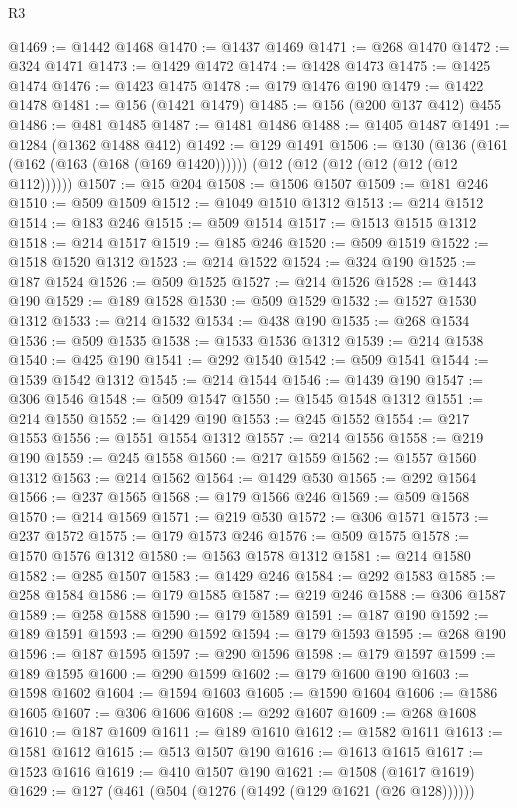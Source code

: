 \begin{lexlean}{R3}
\begin{coremodule}
@1469 := @1442 @1468
@1470 := @1437 @1469
@1471 := @268 @1470
@1472 := @324 @1471
@1473 := @1429 @1472
@1474 := @1428 @1473
@1475 := @1425 @1474
@1476 := @1423 @1475
@1478 := @179 @1476 @190
@1479 := @1422 @1478
@1481 := @156 (@1421 @1479)
@1485 := @156 (@200 @137 @412) @455
@1486 := @481 @1485
@1487 := @1481 @1486
@1488 := @1405 @1487
@1491 := @1284 (@1362 @1488 @412)
@1492 := @129 @1491
@1506 := @130
    (@136 (@161 (@162 (@163 (@168 (@169 @1420))))))
    (@12 (@12 (@12 (@12 (@12 (@12 @112))))))
@1507 := @15 @204
@1508 := @1506 @1507
@1509 := @181 @246
@1510 := @509 @1509
@1512 := @1049 @1510 @1312
@1513 := @214 @1512
@1514 := @183 @246
@1515 := @509 @1514
@1517 := @1513 @1515 @1312
@1518 := @214 @1517
@1519 := @185 @246
@1520 := @509 @1519
@1522 := @1518 @1520 @1312
@1523 := @214 @1522
@1524 := @324 @190
@1525 := @187 @1524
@1526 := @509 @1525
@1527 := @214 @1526
@1528 := @1443 @190
@1529 := @189 @1528
@1530 := @509 @1529
@1532 := @1527 @1530 @1312
@1533 := @214 @1532
@1534 := @438 @190
@1535 := @268 @1534
@1536 := @509 @1535
@1538 := @1533 @1536 @1312
@1539 := @214 @1538
@1540 := @425 @190
@1541 := @292 @1540
@1542 := @509 @1541
@1544 := @1539 @1542 @1312
@1545 := @214 @1544
@1546 := @1439 @190
@1547 := @306 @1546
@1548 := @509 @1547
@1550 := @1545 @1548 @1312
@1551 := @214 @1550
@1552 := @1429 @190
@1553 := @245 @1552
@1554 := @217 @1553
@1556 := @1551 @1554 @1312
@1557 := @214 @1556
@1558 := @219 @190
@1559 := @245 @1558
@1560 := @217 @1559
@1562 := @1557 @1560 @1312
@1563 := @214 @1562
@1564 := @1429 @530
@1565 := @292 @1564
@1566 := @237 @1565
@1568 := @179 @1566 @246
@1569 := @509 @1568
@1570 := @214 @1569
@1571 := @219 @530
@1572 := @306 @1571
@1573 := @237 @1572
@1575 := @179 @1573 @246
@1576 := @509 @1575
@1578 := @1570 @1576 @1312
@1580 := @1563 @1578 @1312
@1581 := @214 @1580
@1582 := @285 @1507
@1583 := @1429 @246
@1584 := @292 @1583
@1585 := @258 @1584
@1586 := @179 @1585
@1587 := @219 @246
@1588 := @306 @1587
@1589 := @258 @1588
@1590 := @179 @1589
@1591 := @187 @190
@1592 := @189 @1591
@1593 := @290 @1592
@1594 := @179 @1593
@1595 := @268 @190
@1596 := @187 @1595
@1597 := @290 @1596
@1598 := @179 @1597
@1599 := @189 @1595
@1600 := @290 @1599
@1602 := @179 @1600 @190
@1603 := @1598 @1602
@1604 := @1594 @1603
@1605 := @1590 @1604
@1606 := @1586 @1605
@1607 := @306 @1606
@1608 := @292 @1607
@1609 := @268 @1608
@1610 := @187 @1609
@1611 := @189 @1610
@1612 := @1582 @1611
@1613 := @1581 @1612
@1615 := @513 @1507 @190
@1616 := @1613 @1615
@1617 := @1523 @1616
@1619 := @410 @1507 @190
@1621 := @1508 (@1617 @1619)
@1629 := @127 (@461 (@504 (@1276 (@1492 (@129 @1621 (@26 @128))))))

\end{coremodule}
\end{lexlean}
